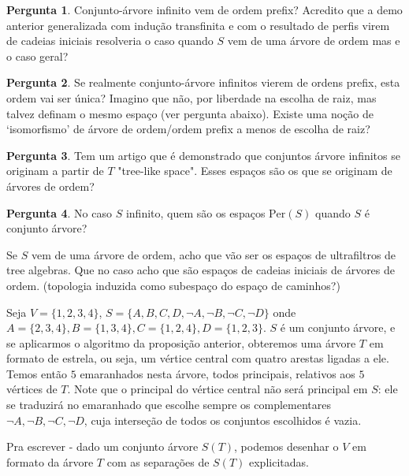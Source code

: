 \documentclass[11pt]{article}
\newcommand{\pulinho}{\vspace{.5cm}}
\theoremstyle{definition}
\theoremstyle{definition}
\theoremstyle{definition}
\theoremstyle{definition}
\theoremstyle{definition}
\theoremstyle{definition}
\theoremstyle{definition}
\theoremstyle{definition}
\theoremstyle{definition}
\theoremstyle{definition}
\newtheorem*{example*}{Exemplo}
\newenvironment{exemplo*}{
\definecolor{shadecolor}{HTML}{b9e6d3}
\begin{shaded}
\begin{example*}
}
{
\end{example*}
\end{shaded}
}
\theoremstyle{definition}
\theoremstyle{definition}
\theoremstyle{definition}
\theoremstyle{definition}
\newtheorem{preguta}{Pergunta}
\newenvironment{pergunta}{
\definecolor{shadecolor}{HTML}{FFF8F0}
\begin{shaded}
\begin{preguta}
}
{
\end{preguta}
\end{shaded}
}
\begin{document}
\begin{pergunta}
  Conjunto-árvore infinito vem de ordem prefix? Acredito que a demo anterior generalizada com indução transfinita e com o resultado de perfis virem de cadeias iniciais resolveria o caso quando $S$ vem de uma árvore de ordem mas e o caso geral?
\end{pergunta}

\begin{pergunta}
Se realmente conjunto-árvore infinitos vierem de ordens prefix, esta ordem vai ser única? Imagino que não, por liberdade na escolha de raiz, mas talvez definam o mesmo espaço (ver pergunta abaixo). Existe uma noção de `isomorfismo' de árvore de ordem/ordem prefix a menos de escolha de raiz?
\end{pergunta}

\begin{pergunta}
Tem um artigo \cite{arvoredoconjuntoarvore} que é demonstrado que conjuntos árvore infinitos se originam a partir de $T$ "tree-like space". Esses espaços são os que se originam de árvores de ordem?
\end{pergunta}

\begin{pergunta}
  No caso $S$ infinito, quem são os espaços $\text{Per}(S)$ quando $S$ é conjunto árvore?  

  Se $S$ vem de uma árvore de ordem, acho que vão ser os espaços de ultrafiltros de tree algebras. Que no caso acho que são espaços de cadeias iniciais de árvores de ordem. (topologia induzida como subespaço do espaço de caminhos?)
\end{pergunta}


\pulinho


\begin{exemplo*}
 Seja $V = \{1,2,3,4\}$, $S = \{A,B,C,D,\lnot A, \lnot B, \lnot C, \lnot D\}$ onde $A = \{2,3,4\}, B = \{1,3,4\}, C = \{1,2,4\}, D = \{1,2,3\}$. $S$ é um conjunto árvore, e se aplicarmos o algoritmo da proposição anterior, obteremos uma árvore $T$ em formato de estrela, ou seja, um vértice central com quatro arestas ligadas a ele. Temos então $5$ emaranhados nesta árvore, todos principais, relativos aos $5$ vértices de $T$. Note que o principal do vértice central não será principal em $S$: ele se traduzirá no emaranhado que escolhe sempre os complementares $\lnot A, \lnot B, \lnot C, \lnot D$, cuja interseção de todos os conjuntos escolhidos é vazia.
\end{exemplo*}

\begin{exemplo*}[Visualização]
  Pra escrever - dado um conjunto árvore $S(T)$, podemos desenhar o $V$ em formato da árvore $T$ com as separações de $S(T)$ explicitadas.
\end{exemplo*}
\end{document}
